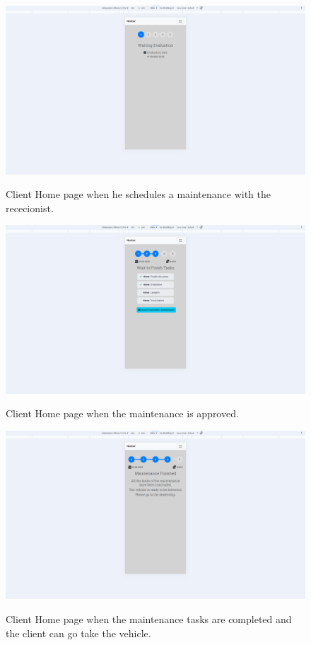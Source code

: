 \begin{figure}[htbp]
  \caption{Client Home page when he schedules a maintenance with the rececionist.}
  \centering
  \includegraphics[width=\textwidth]{figs/Implementation/client/MaintenanceState1}
  \label{fig:MaintenanceState1}
\end{figure}




\begin{figure}[htbp]
  \caption{Client Home page when the maintenance is approved.}
  \centering
  \includegraphics[width=\textwidth]{figs/Implementation/client/MaintenanceState3}
  \label{fig:MaintenanceState3}
\end{figure}


\begin{figure}[htbp]
  \caption{Client Home page when the maintenance tasks are completed and the client can go take the vehicle.}
  \centering
  \includegraphics[width=\textwidth]{figs/Implementation/client/MaintenanceState4}
  \label{fig:MaintenanceState4}
\end{figure}



